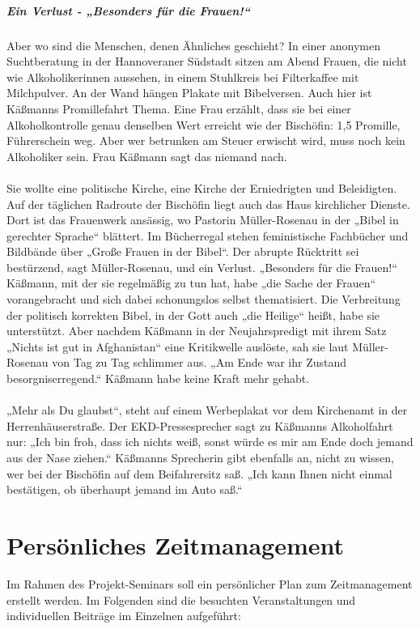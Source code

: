\documentclass[a4paper,12pt,oneside]{scrbook}
\begin{document}
\paragraph{Ein Verlust - „Besonders für die Frauen!“}
Aber wo sind die Menschen, denen Ähnliches geschieht? In einer anonymen Suchtberatung in der Hannoveraner Südstadt sitzen am Abend Frauen, die nicht wie Alkoholikerinnen aussehen, in einem Stuhlkreis bei Filterkaffee mit Milchpulver. An der Wand hängen Plakate mit Bibelversen. Auch hier ist Käßmanns Promillefahrt Thema. Eine Frau erzählt, dass sie bei einer Alkoholkontrolle genau denselben Wert erreicht wie der Bischöfin: 1,5 Promille, Führerschein weg. Aber wer betrunken am Steuer erwischt wird, muss noch kein Alkoholiker sein. Frau Käßmann sagt das niemand nach.
\\\\
Sie wollte eine politische Kirche, eine Kirche der Erniedrigten und Beleidigten. Auf der täglichen Radroute der Bischöfin liegt auch das Haus kirchlicher Dienste. Dort ist das Frauenwerk ansässig, wo Pastorin Müller-Rosenau in der „Bibel in gerechter Sprache“ blättert. Im Bücherregal stehen feministische Fachbücher und Bildbände über „Große Frauen in der Bibel“. Der abrupte Rücktritt sei bestürzend, sagt Müller-Rosenau, und ein Verlust. „Besonders für die Frauen!“ Käßmann, mit der sie regelmäßig zu tun hat, habe „die Sache der Frauen“ vorangebracht und sich dabei schonungslos selbst thematisiert. Die Verbreitung der politisch korrekten Bibel, in der Gott auch „die Heilige“ heißt, habe sie unterstützt. Aber nachdem Käßmann in der Neujahrspredigt mit ihrem Satz „Nichts ist gut in Afghanistan“ eine Kritikwelle auslöste, sah sie laut Müller-Rosenau von Tag zu Tag schlimmer aus. „Am Ende war ihr Zustand besorgniserregend.“ Käßmann habe keine Kraft mehr gehabt.
\\\\
„Mehr als Du glaubst“, steht auf einem Werbeplakat vor dem Kirchenamt in der Herrenhäuserstraße. Der EKD-Pressesprecher sagt zu Käßmanns Alkoholfahrt nur: „Ich bin froh, dass ich nichts weiß, sonst würde es mir am Ende doch jemand aus der Nase ziehen.“ Käßmanns Sprecherin gibt ebenfalls an, nicht zu wissen, wer bei der Bischöfin auf dem Beifahrersitz saß. „Ich kann Ihnen nicht einmal bestätigen, ob überhaupt jemand im Auto saß.“
\chapter{Persönliches Zeitmanagement}
Im Rahmen des Projekt-Seminars soll ein persönlicher Plan zum Zeitmanagement erstellt werden.
Im Folgenden sind die besuchten Veranstaltungen und individuellen Beiträge im Einzelnen aufgeführt:\\
\end{document}
